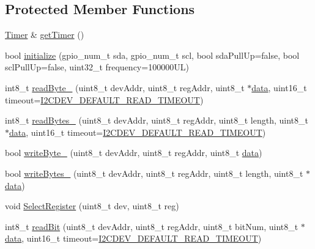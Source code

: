 \subsection*{Protected Member Functions}
\begin{DoxyCompactItemize}
\item 
\mbox{\hyperlink{classTimer}{Timer}} \& \mbox{\hyperlink{classperif_1_1Perif_a29c48598a861d85256c30e28af67f864}{get\+Timer}} ()
\item 
bool \mbox{\hyperlink{classI2Cdev_a794a92b925f7970399f8b148caa5eef8}{initialize}} (gpio\+\_\+num\+\_\+t sda, gpio\+\_\+num\+\_\+t scl, bool sda\+Pull\+Up=false, bool scl\+Pull\+Up=false, uint32\+\_\+t frequency=100000\+U\+L)
\item 
int8\+\_\+t \mbox{\hyperlink{classI2Cdev_a74447cfadf4d5054ba29b726afcdecd0}{read\+Byte\+\_\+}} (uint8\+\_\+t dev\+Addr, uint8\+\_\+t reg\+Addr, uint8\+\_\+t $\ast$\mbox{\hyperlink{classperif_1_1PerifBase_a1a3afaa535fda17e9f97123fffe78765}{data}}, uint16\+\_\+t timeout=\mbox{\hyperlink{I2Cdev_8h_ad9726bb02451bb8f59d3d2729e4cd20e}{I2\+C\+D\+E\+V\+\_\+\+D\+E\+F\+A\+U\+L\+T\+\_\+\+R\+E\+A\+D\+\_\+\+T\+I\+M\+E\+O\+UT}})
\item 
int8\+\_\+t \mbox{\hyperlink{classI2Cdev_a3fae6b1ae9e9398b682eb7bdf6b43561}{read\+Bytes\+\_\+}} (uint8\+\_\+t dev\+Addr, uint8\+\_\+t reg\+Addr, uint8\+\_\+t length, uint8\+\_\+t $\ast$\mbox{\hyperlink{classperif_1_1PerifBase_a1a3afaa535fda17e9f97123fffe78765}{data}}, uint16\+\_\+t timeout=\mbox{\hyperlink{I2Cdev_8h_ad9726bb02451bb8f59d3d2729e4cd20e}{I2\+C\+D\+E\+V\+\_\+\+D\+E\+F\+A\+U\+L\+T\+\_\+\+R\+E\+A\+D\+\_\+\+T\+I\+M\+E\+O\+UT}})
\item 
bool \mbox{\hyperlink{classI2Cdev_a97645c5d6a3e295bb72b9ee5ab810d12}{write\+Byte\+\_\+}} (uint8\+\_\+t dev\+Addr, uint8\+\_\+t reg\+Addr, uint8\+\_\+t \mbox{\hyperlink{classperif_1_1PerifBase_a1a3afaa535fda17e9f97123fffe78765}{data}})
\item 
bool \mbox{\hyperlink{classI2Cdev_a2f9176cd44c3163ca3929ac1c2ff601b}{write\+Bytes\+\_\+}} (uint8\+\_\+t dev\+Addr, uint8\+\_\+t reg\+Addr, uint8\+\_\+t length, uint8\+\_\+t $\ast$\mbox{\hyperlink{classperif_1_1PerifBase_a1a3afaa535fda17e9f97123fffe78765}{data}})
\item 
void \mbox{\hyperlink{classI2Cdev_a3be31bf7d3f40bb215d8854aac945db3}{Select\+Register}} (uint8\+\_\+t dev, uint8\+\_\+t reg)
\item 
int8\+\_\+t \mbox{\hyperlink{classI2Cdev_ab028a4f330f4f31dc8af9890431a2a63}{read\+Bit}} (uint8\+\_\+t dev\+Addr, uint8\+\_\+t reg\+Addr, uint8\+\_\+t bit\+Num, uint8\+\_\+t $\ast$\mbox{\hyperlink{classperif_1_1PerifBase_a1a3afaa535fda17e9f97123fffe78765}{data}}, uint16\+\_\+t timeout=\mbox{\hyperlink{I2Cdev_8h_ad9726bb02451bb8f59d3d2729e4cd20e}{I2\+C\+D\+E\+V\+\_\+\+D\+E\+F\+A\+U\+L\+T\+\_\+\+R\+E\+A\+D\+\_\+\+T\+I\+M\+E\+O\+UT}})

\end{DoxyCompactItemize}

